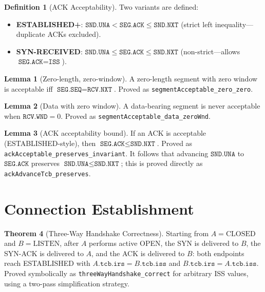 \documentclass[11pt]{article}
\theoremstyle{definition}
\newtheorem{definition}{Definition}[section]
\newtheorem{theorem}{Theorem}[section]
\newtheorem{lemma}[theorem]{Lemma}
\begin{document}
\begin{definition}[ACK Acceptability]
Two variants are defined:
\begin{itemize}
  \item \textbf{ESTABLISHED+}: $\texttt{SND.UNA} < \texttt{SEG.ACK} \leq
    \texttt{SND.NXT}$ (strict left inequality---duplicate ACKs excluded).
  \item \textbf{SYN-RECEIVED}: $\texttt{SND.UNA} \leq \texttt{SEG.ACK} \leq
    \texttt{SND.NXT}$ (non-strict---allows $\texttt{SEG.ACK} = \texttt{ISS}$).
\end{itemize}
\end{definition}

\begin{lemma}[Zero-length, zero-window]
A zero-length segment with zero window is acceptable iff
$\texttt{SEG.SEQ} = \texttt{RCV.NXT}$.
Proved as \texttt{segmentAcceptable\_zero\_zero}.
\end{lemma}

\begin{lemma}[Data with zero window]
A data-bearing segment is never acceptable when $\texttt{RCV.WND} = 0$.
Proved as \texttt{segmentAcceptable\_data\_zeroWnd}.
\end{lemma}

\begin{lemma}[ACK acceptability bound]
If an ACK is acceptable (ESTABLISHED-style), then
$\texttt{SEG.ACK} \leq \texttt{SND.NXT}$.
Proved as \texttt{ackAcceptable\_preserves\_invariant}.
It follows that advancing $\texttt{SND.UNA}$ to $\texttt{SEG.ACK}$
preserves $\texttt{SND.UNA} \leq \texttt{SND.NXT}$; this is proved
directly as \texttt{ackAdvanceTcb\_preserves}.
\end{lemma}

\section{Connection Establishment}
\label{sec:handshake}

\begin{theorem}[Three-Way Handshake Correctness]
Starting from $A = \text{CLOSED}$ and $B = \text{LISTEN}$, after $A$ performs
active OPEN, the SYN is delivered to $B$, the SYN-ACK is delivered to $A$,
and the ACK is delivered to $B$: both endpoints reach ESTABLISHED with
$A.\texttt{tcb.irs} = B.\texttt{tcb.iss}$ and $B.\texttt{tcb.irs} =
A.\texttt{tcb.iss}$.
Proved symbolically as \texttt{threeWayHandshake\_correct} for arbitrary ISS
values, using a two-pass simplification strategy.
\end{theorem}
\end{document}
